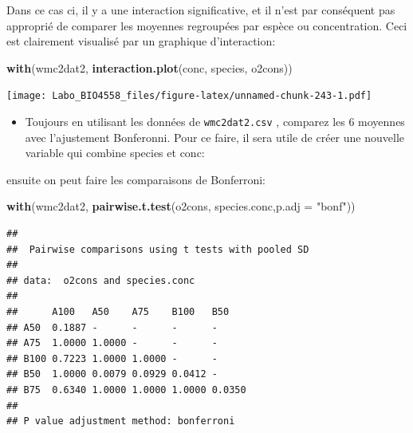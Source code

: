 \documentclass[12pt,]{book}
\newenvironment{Shaded}{\begin{snugshade}}{\end{snugshade}}
\newcommand{\DataTypeTok}[1]{\textcolor[rgb]{0.27,0.27,0.27}{#1}}
\newcommand{\KeywordTok}[1]{\textcolor[rgb]{0.27,0.27,0.27}{\textbf{#1}}}
\newcommand{\NormalTok}[1]{#1}
\newcommand{\OperatorTok}[1]{\textcolor[rgb]{0.43,0.43,0.43}{\textbf{#1}}}
\newcommand{\StringTok}[1]{\textcolor[rgb]{0.5,0.5,0.5}{#1}}
\providecommand{\tightlist}{%
  \setlength{\itemsep}{0pt}\setlength{\parskip}{0pt}}
\begin{document}
Dans ce cas ci, il y a une interaction significative, et il n'est par conséquent pas approprié de comparer les moyennes regroupées par espèce ou concentration. Ceci est clairement visualisé par un graphique d'interaction:

\begin{Shaded}
\begin{Highlighting}[]
\KeywordTok{with}\NormalTok{(wmc2dat2, }\KeywordTok{interaction.plot}\NormalTok{(conc, species, o2cons))}
\end{Highlighting}
\end{Shaded}

\texttt{[image: Labo\_BIO4558\_files/figure-latex/unnamed-chunk-243-1.pdf]}

\begin{itemize}
\tightlist
\item
  Toujours en utilisant les données de \texttt{wmc2dat2.csv} , comparez les 6 moyennes avec l'ajustement Bonferonni. Pour ce faire, il sera utile de créer une nouvelle variable qui combine species et conc:
\end{itemize}

\begin{Shaded}
\end{Shaded}

ensuite on peut faire les comparaisons de Bonferroni:

\begin{Shaded}
\begin{Highlighting}[]
\KeywordTok{with}\NormalTok{(wmc2dat2, }\KeywordTok{pairwise.t.test}\NormalTok{(o2cons, species.conc,}\DataTypeTok{p.adj =} \StringTok{"bonf"}\NormalTok{))}
\end{Highlighting}
\end{Shaded}

\begin{verbatim}
## 
## 	Pairwise comparisons using t tests with pooled SD 
## 
## data:  o2cons and species.conc 
## 
##      A100   A50    A75    B100   B50   
## A50  0.1887 -      -      -      -     
## A75  1.0000 1.0000 -      -      -     
## B100 0.7223 1.0000 1.0000 -      -     
## B50  1.0000 0.0079 0.0929 0.0412 -     
## B75  0.6340 1.0000 1.0000 1.0000 0.0350
## 
## P value adjustment method: bonferroni
\end{verbatim}
\end{document}
